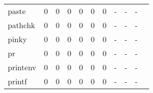 \begin{longtable}{lp{1.2cm}p{1.2cm}p{1.2cm}p{1.2cm}p{1.2cm}p{1.2cm}p{1.2cm}p{1.2cm}p{1.2cm}p{1.2cm}}
paste     &                                     0 &                                                  0 &                                                  0 &                                                  0 &                                                  0 &                                                  0 &                                             - &                                                  - &                                                  - \\
pathchk   &                                     0 &                                                  0 &                                                  0 &                                                  0 &                                                  0 &                                                  0 &                                             - &                                                  - &                                                  - \\
pinky     &                                     0 &                                                  0 &                                                  0 &                                                  0 &                                                  0 &                                                  0 &                                             - &                                                  - &                                                  - \\
pr        &                                     0 &                                                  0 &                                                  0 &                                                  0 &                                                  0 &                                                  0 &                                             - &                                                  - &                                                  - \\
printenv  &                                     0 &                                                  0 &                                                  0 &                                                  0 &                                                  0 &                                                  0 &                                             - &                                                  - &                                                  - \\
printf    &                                     0 &                                                  0 &                                                  0 &                                                  0 &                                                  0 &                                                  0 &                                             - &                                                  - &                                                  - \\

\end{longtable}
